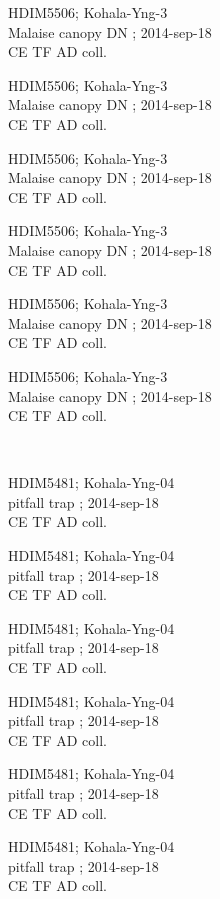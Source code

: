 \documentclass[2pt]{extarticle}
\begin{document}
\noindent
\parbox{0.16\textwidth}{\tiny \raggedright \rule[-0.3\baselineskip]{0pt}{10pt}HDIM5506; Kohala-Yng-3\\ Malaise canopy DN  ; 2014-sep-18\\ CE TF AD coll.}
\parbox{0.16\textwidth}{\tiny \raggedright \rule[-0.3\baselineskip]{0pt}{10pt}HDIM5506; Kohala-Yng-3\\ Malaise canopy DN  ; 2014-sep-18\\ CE TF AD coll.}
\parbox{0.16\textwidth}{\tiny \raggedright \rule[-0.3\baselineskip]{0pt}{10pt}HDIM5506; Kohala-Yng-3\\ Malaise canopy DN  ; 2014-sep-18\\ CE TF AD coll.}
\parbox{0.16\textwidth}{\tiny \raggedright \rule[-0.3\baselineskip]{0pt}{10pt}HDIM5506; Kohala-Yng-3\\ Malaise canopy DN  ; 2014-sep-18\\ CE TF AD coll.}
\parbox{0.16\textwidth}{\tiny \raggedright \rule[-0.3\baselineskip]{0pt}{10pt}HDIM5506; Kohala-Yng-3\\ Malaise canopy DN  ; 2014-sep-18\\ CE TF AD coll.}
\parbox{0.16\textwidth}{\tiny \raggedright \rule[-0.3\baselineskip]{0pt}{10pt}HDIM5506; Kohala-Yng-3\\ Malaise canopy DN  ; 2014-sep-18\\ CE TF AD coll.} \\ 
\vspace{0.001in} 

\noindent
\parbox{0.16\textwidth}{\tiny \raggedright \rule[-0.3\baselineskip]{0pt}{10pt}HDIM5481; Kohala-Yng-04\\ pitfall trap  ; 2014-sep-18\\ CE TF AD coll.}
\parbox{0.16\textwidth}{\tiny \raggedright \rule[-0.3\baselineskip]{0pt}{10pt}HDIM5481; Kohala-Yng-04\\ pitfall trap  ; 2014-sep-18\\ CE TF AD coll.}
\parbox{0.16\textwidth}{\tiny \raggedright \rule[-0.3\baselineskip]{0pt}{10pt}HDIM5481; Kohala-Yng-04\\ pitfall trap  ; 2014-sep-18\\ CE TF AD coll.}
\parbox{0.16\textwidth}{\tiny \raggedright \rule[-0.3\baselineskip]{0pt}{10pt}HDIM5481; Kohala-Yng-04\\ pitfall trap  ; 2014-sep-18\\ CE TF AD coll.}
\parbox{0.16\textwidth}{\tiny \raggedright \rule[-0.3\baselineskip]{0pt}{10pt}HDIM5481; Kohala-Yng-04\\ pitfall trap  ; 2014-sep-18\\ CE TF AD coll.}
\parbox{0.16\textwidth}{\tiny \raggedright \rule[-0.3\baselineskip]{0pt}{10pt}HDIM5481; Kohala-Yng-04\\ pitfall trap  ; 2014-sep-18\\ CE TF AD coll.} \\ 
\vspace{0.001in} 
\end{document}
